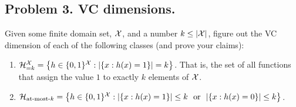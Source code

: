 \documentclass[12pt]{article}
\theoremstyle{plain}
\theoremstyle{definition}
\begin{document}
\subsection*{Problem 3. VC dimensions.}
Given some finite domain set, ${\cal X}$, and a number $k\leq |{\cal X}|$, figure out the VC dimension of each of the following classes (and prove your claims):
\begin{enumerate}
    \item ${\cal H}^{\cal X}_{=k}=\left\{h\in \{0,1\}^{\cal X}:|\{x:h(x)=1\}|=k\right\}$. That is, the set of all functions that assign the value $1$ to exactly $k$ elements of ${\cal X}$.
    \item ${\cal H}_{\text{at-most-}k} = \left\{h\in \{0, 1\}^{\cal X}:|\{x:h(x)=1\}|\leq k~~\text{or}~~|\{x:h(x)=0\}|\leq k\right\}$.
\end{enumerate}
\end{document}
